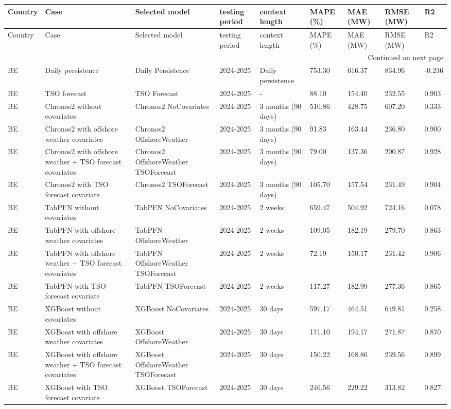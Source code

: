 \begin{longtable}{lllllllll}
\toprule
Country & Case & Selected model & testing period & context length & MAPE (\%) & MAE (MW) & RMSE (MW) & R2 \\
\midrule
\endfirsthead
\toprule
Country & Case & Selected model & testing period & context length & MAPE (\%) & MAE (MW) & RMSE (MW) & R2 \\
\midrule
\endhead
\midrule
\multicolumn{9}{r}{Continued on next page} \\
\midrule
\endfoot
\bottomrule
\endlastfoot
BE & Daily persistence & Daily Persistence & 2024-2025 & Daily persistence & 753.30 & 616.37 & 834.96 & -0.236 \\
BE & TSO forecast & TSO Forecast & 2024-2025 & - & 88.10 & 154.40 & 232.55 & 0.903 \\
BE & Chronos2 without covariates & Chronos2 NoCovariates & 2024-2025 & 3 months (90 days) & 510.86 & 428.75 & 607.20 & 0.333 \\
BE & Chronos2 with offshore weather covariates & Chronos2 OffshoreWeather & 2024-2025 & 3 months (90 days) & 91.83 & 163.44 & 236.80 & 0.900 \\
BE & Chronos2 with offshore weather + TSO forecast covariates & Chronos2 OffshoreWeather TSOForecast & 2024-2025 & 3 months (90 days) & 79.00 & 137.36 & 200.87 & 0.928 \\
BE & Chronos2 with TSO forecast covariate & Chronos2 TSOForecast & 2024-2025 & 3 months (90 days) & 105.70 & 157.54 & 231.49 & 0.904 \\
BE & TabPFN without covariates & TabPFN NoCovariates & 2024-2025 & 2 weeks & 659.47 & 504.92 & 724.16 & 0.078 \\
BE & TabPFN with offshore weather covariates & TabPFN OffshoreWeather & 2024-2025 & 2 weeks & 109.05 & 182.19 & 279.70 & 0.863 \\
BE & TabPFN with offshore weather + TSO forecast covariates & TabPFN OffshoreWeather TSOForecast & 2024-2025 & 2 weeks & 72.19 & 150.17 & 231.42 & 0.906 \\
BE & TabPFN with TSO forecast covariate & TabPFN TSOForecast & 2024-2025 & 2 weeks & 117.27 & 182.99 & 277.36 & 0.865 \\
BE & XGBoost without covariates & XGBoost NoCovariates & 2024-2025 & 30 days & 597.17 & 464.51 & 649.81 & 0.258 \\
BE & XGBoost with offshore weather covariates & XGBoost OffshoreWeather & 2024-2025 & 30 days & 171.10 & 194.17 & 271.87 & 0.870 \\
BE & XGBoost with offshore weather + TSO forecast covariates & XGBoost OffshoreWeather TSOForecast & 2024-2025 & 30 days & 150.22 & 168.86 & 239.56 & 0.899 \\
BE & XGBoost with TSO forecast covariate & XGBoost TSOForecast & 2024-2025 & 30 days & 246.56 & 229.22 & 313.82 & 0.827 \\
\end{longtable}
